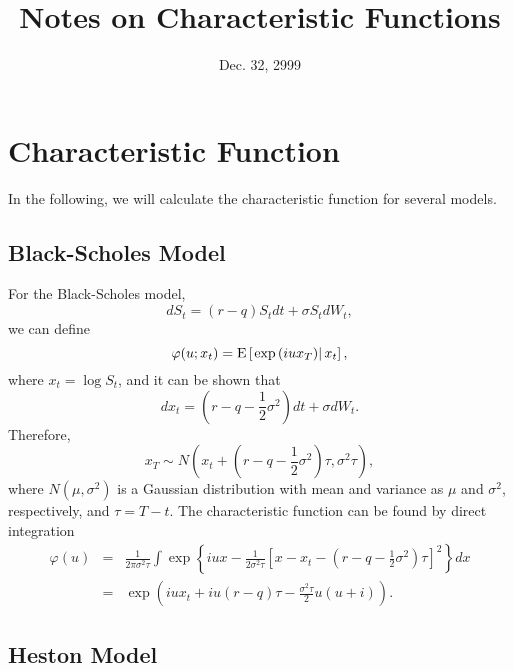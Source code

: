 \documentclass[12pt]{article}
\begin{document}
\title{Notes on Characteristic Functions}
\date{Dec. 32, 2999}

\maketitle

\section{Characteristic Function}

  In the following, we will calculate the characteristic function for several models.

  \subsection{Black-Scholes Model}

    For the Black-Scholes model,
    \begin{equation}
      dS_t=(r-q)S_tdt+\sigma S_tdW_t,
    \end{equation}
    we can define
    \begin{equation}
      \varphi(u; x_t)={\rm E}\left[\left.\exp\left(iux_T\right)\right|x_t\right],
      \label{char00}
    \end{equation}
    where $x_t=\log S_t$, and it can be shown that
    \begin{equation}
      dx_t = \left(r-q-\frac{1}{2}\sigma^2\right) dt + \sigma dW_t.
    \end{equation}
    Therefore,
    \begin{equation}
      x_T\sim N\left(x_t+\left(r-q-\frac{1}{2}\sigma^2\right)\tau, \sigma^2\tau\right),
    \end{equation}
    where $N(\mu,\sigma^2)$ is a Gaussian distribution with mean and variance
    as $\mu$ and $\sigma^2$, respectively, and $\tau=T-t$. The characteristic function can be found by direct integration
    \begin{eqnarray}
      \varphi(u)&=&\frac{1}{2\pi\sigma^2 \tau}\int \exp\left\{iux-\frac{1}{2\sigma^2\tau}
                      \left[x-x_t-\left(r-q-\frac{1}{2}\sigma^2\right)\tau\right]^2\right\}dx\nonumber\\
                &=&\exp\left(iux_t + iu(r-q)\tau -\frac{\sigma^2\tau}{2}u(u+i)\right).
      \label{BS}
    \end{eqnarray}

  \subsection{Heston Model}
\end{document}
